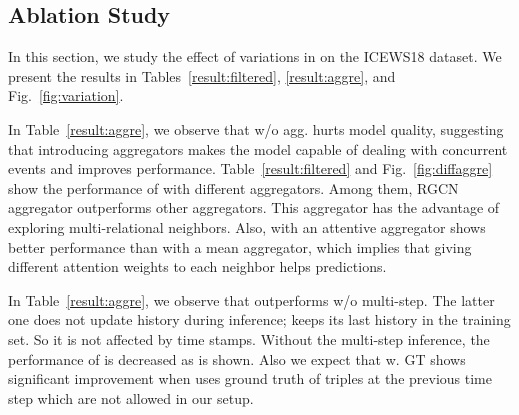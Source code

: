 \subsection{Ablation Study}
\label{exp:ablation}
In this section, we study the effect of variations in \method on the ICEWS18 dataset.
We present the results in Tables~\ref{result:filtered}, \ref{result:aggre}, and Fig.~\ref{fig:variation}. 


In Table~\ref{result:aggre}, we observe that \method w/o agg. hurts model quality, suggesting that introducing aggregators makes the model capable of dealing with concurrent events and improves performance.
Table~\ref{result:filtered} and Fig.~\ref{fig:diffaggre} show the performance of \method with different aggregators. 
Among them, RGCN aggregator outperforms other aggregators.
This aggregator has the advantage of exploring multi-relational neighbors. 
Also, \method with an attentive aggregator shows better performance than \method with a mean aggregator, which implies that giving different attention weights to each neighbor helps predictions.

In Table~\ref{result:aggre}, we observe that \method outperforms \method w/o multi-step. The latter one does not update history during inference; keeps its last history in the training set. So it is not affected by time stamps. 
Without the multi-step inference, the performance of \method is decreased as is shown.
Also we expect that \method w. GT shows significant improvement when \method uses ground truth of triples at the previous time step which are not allowed in our setup.



